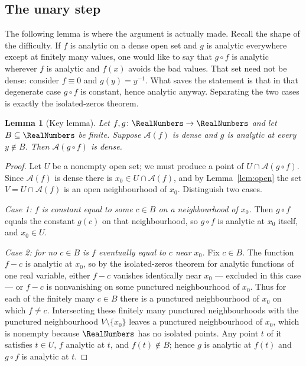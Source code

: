 \documentclass[11pt,oneside]{article}
\newtheorem{lemma}[theorem]{Lemma}
\theoremstyle{definition}
\theoremstyle{remark}
\newcommand{\An}{\mathcal A}
\begin{document}
\subsection{The unary step}

The following lemma is where the argument is actually made.  Recall the shape
of the difficulty.  If $f$ is analytic on a dense open set and $g$ is analytic
everywhere except at finitely many values, one would like to say that
$g\circ f$ is analytic wherever $f$ is analytic and $f(x)$ avoids the bad
values.  That set need not be dense: consider $f\equiv 0$ and $g(y)=y^{-1}$.
What saves the statement is that in that degenerate case $g\circ f$ is
constant, hence analytic anyway.  Separating the two cases is exactly the
isolated-zeros theorem.

\begin{lemma}[Key lemma]\label{lem:key}
Let $f,g\colon\RealNumbers\to\RealNumbers$ and let $B\subseteq\RealNumbers$ be finite.  Suppose $\An(f)$ is
dense and $g$ is analytic at every $y\notin B$.  Then $\An(g\circ f)$ is
dense.
\end{lemma}

\begin{proof}
Let $U$ be a nonempty open set; we must produce a point of $U\cap\An(g\circ
f)$.  Since $\An(f)$ is dense there is $x_0\in U\cap\An(f)$, and by
Lemma~\ref{lem:open} the set $V=U\cap\An(f)$ is an open neighbourhood of $x_0$.
Distinguish two cases.

\emph{Case 1: $f$ is constant equal to some $c\in B$ on a neighbourhood of
$x_0$.}  Then $g\circ f$ equals the constant $g(c)$ on that neighbourhood, so
$g\circ f$ is analytic at $x_0$ itself, and $x_0\in U$.

\emph{Case 2: for no $c\in B$ is $f$ eventually equal to $c$ near $x_0$.}  Fix
$c\in B$.  The function $f-c$ is analytic at $x_0$, so by the isolated-zeros
theorem for analytic functions of one real variable, either $f-c$ vanishes
identically near $x_0$ --- excluded in this case --- or $f-c$ is nonvanishing
on some punctured neighbourhood of $x_0$.  Thus for each of the finitely many
$c\in B$ there is a punctured neighbourhood of $x_0$ on which $f\ne c$.
Intersecting these finitely many punctured neighbourhoods with the punctured
neighbourhood $V\setminus\{x_0\}$ leaves a punctured neighbourhood of $x_0$,
which is nonempty because $\RealNumbers$ has no isolated points.  Any point $t$ of it
satisfies $t\in U$, $f$ analytic at $t$, and $f(t)\notin B$; hence $g$ is
analytic at $f(t)$ and $g\circ f$ is analytic at $t$.
\end{proof}
\end{document}
